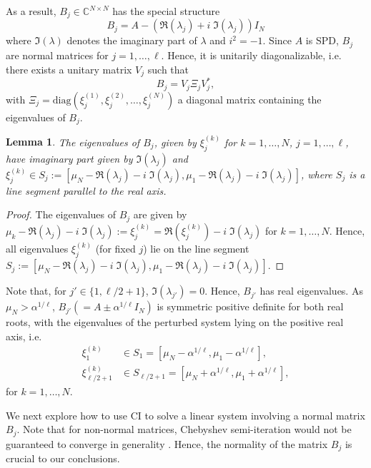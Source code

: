 \documentclass{article}
\newtheorem{lem}{Lemma}
\newcommand{\umax}{\mu_{1}}
\newcommand{\umin}{\mu_{\sizeA}}
\newcommand{\sizeA}{N}
\theoremstyle{definition}
\begin{document}
{		As a result, $B_j \in \mathbb{C}^{\sizeA \times \sizeA}$ has the special structure 
		$$
		B_j = A - (\Re(\lambda_j) + i \;\Im(\lambda_j) )I_N
		$$
		where $\Im(\lambda)$ denotes the imaginary part of $\lambda$ and $i^2 = -1$.
		Since $A$ is SPD, $B_j$ are normal matrices for $j=1, \ldots, \ell$. Hence, it is unitarily diagonalizable, i.e. there exists a unitary matrix $V_j$ such that 
		\begin{equation}
			\label{eq:Bdecomp}
			B_j = V_j \Xi_j V_j^{\ast},
		\end{equation}
		with $\Xi_j = \textrm{diag}(\xi_{j}^{(1)}, \xi_{j}^{(2)}, \ldots, \xi_{j}^{(\sizeA)})$ a diagonal matrix containing the eigenvalues of $B_j$. 
		\begin{lem}\label{lem:evals}
			The eigenvalues of $B_j$, given by $\xi_j^{(k)}$ for $k = 1,\ldots, \sizeA$, $j = 1,\dots,\ell$, have imaginary part given by 
			$\Im(\lambda_j)$ and $\xi_j^{(k)} \in S_j := [\umin - \Re(\lambda_j) - i \; \Im(\lambda_j), \umax - \Re(\lambda_j) - i \;\Im(\lambda_j)]$, where $S_j$ is a line segment parallel to the real axis.\end{lem}
		\begin{proof}
			The eigenvalues of $B_j$ are given by $ \mu_k - \Re(\lambda_j) - i\;\Im(\lambda_j) := \xi_j^{(k)} = \Re(\xi_j^{(k)}) - i\;\Im(\lambda_j) $ for $k = 1,\dots,N$.
			Hence, all eigenvalues $\xi_j^{(k)}$ (for fixed $j$) lie on the line segment $S_j := [\umin - \Re(\lambda_j) - i\;\Im(\lambda_j), \umax - \Re(\lambda_j) - i\;\Im(\lambda_j)]$.
		\end{proof} 
		Note that, for $j' \in \{1, \ell/2 + 1\}$, 
		$\Im(\lambda_{j'}) = 0$. Hence, $B_{j'}$ has real eigenvalues. As $\umin > {\alpha}^{1/\ell}$,  $ B_{j'} (= {A}\pm {\alpha^{1/\ell}}I_\sizeA)$ is symmetric positive definite for both real roots, with the eigenvalues of the perturbed system lying on the positive real axis, i.e. 
		\begin{align*}
			\xi_1^{(k)} & \in S_1 = [\umin - \alpha^{1 / \ell}, \umax- \alpha^{1 / \ell}], \\ 
			\xi_{\ell/2 + 1}^{(k)} & \in S_{\ell/2 + 1} = [\umin + \alpha^{1 / \ell}, \umax + \alpha^{1 / \ell}], 
		\end{align*}
		for $k = 1, \ldots, \sizeA$. 
		
		
		We next explore how to use CI to solve a linear system involving a normal matrix $B_j$. {Note that for non-normal matrices, Chebyshev semi-iteration would not be guaranteed to converge in generality \cite{manteuffel1978}. Hence, the normality of the matrix $B_j$ is crucial to our conclusions.}
		
}
\end{document}
